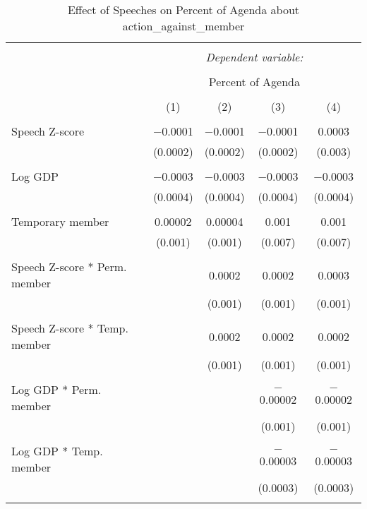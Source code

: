 
\begin{table}[!htbp] \centering 
  \caption{Effect of Speeches on Percent of Agenda about action_against_member} 
  \label{} 
\begin{tabular}{@{\extracolsep{5pt}}lcccc} 
\\[-1.8ex]\hline 
\hline \\[-1.8ex] 
 & \multicolumn{4}{c}{\textit{Dependent variable:}} \\ 
\cline{2-5} 
\\[-1.8ex] & \multicolumn{4}{c}{Percent of Agenda} \\ 
\\[-1.8ex] & (1) & (2) & (3) & (4)\\ 
\hline \\[-1.8ex] 
 Speech Z-score & $-$0.0001 & $-$0.0001 & $-$0.0001 & 0.0003 \\ 
  & (0.0002) & (0.0002) & (0.0002) & (0.003) \\ 
  & & & & \\ 
 Log GDP & $-$0.0003 & $-$0.0003 & $-$0.0003 & $-$0.0003 \\ 
  & (0.0004) & (0.0004) & (0.0004) & (0.0004) \\ 
  & & & & \\ 
 Temporary member & 0.00002 & 0.00004 & 0.001 & 0.001 \\ 
  & (0.001) & (0.001) & (0.007) & (0.007) \\ 
  & & & & \\ 
 Speech Z-score * Perm. member &  & 0.0002 & 0.0002 & 0.0003 \\ 
  &  & (0.001) & (0.001) & (0.001) \\ 
  & & & & \\ 
 Speech Z-score * Temp. member &  & 0.0002 & 0.0002 & 0.0002 \\ 
  &  & (0.001) & (0.001) & (0.001) \\ 
  & & & & \\ 
 Log GDP * Perm. member &  &  & $-$0.00002 & $-$0.00002 \\ 
  &  &  & (0.001) & (0.001) \\ 
  & & & & \\ 
 Log GDP * Temp. member &  &  & $-$0.00003 & $-$0.00003 \\ 
  &  &  & (0.0003) & (0.0003) \\ 
  & & & & \\ 

\end{tabular}
\end{table}
